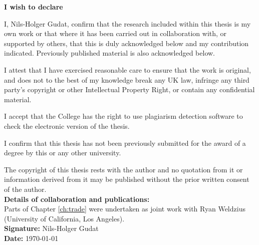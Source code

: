 \begin{onehalfspacing}

\begin{declaration}      %

\thispagestyle{plain}

\textbf{I wish to declare}

I, Nils-Holger Gudat, confirm that the research included within this thesis is my own work or that where it has been carried out in collaboration with, or supported by others, that this is duly acknowledged below and my contribution indicated. Previously published material is also acknowledged below.

I attest that I have exercised reasonable care to ensure that the work is original, and does not to the best of my knowledge break any UK law, infringe any third party's copyright or other Intellectual Property Right, or contain any confidential material.

I accept that the College has the right to use plagiarism detection software to check the electronic version of the thesis.

I confirm that this thesis has not been previously submitted for the award of a degree by this or any other university.

The copyright of this thesis rests with the author and no quotation from it or information derived from it may be published without the prior written consent of the author.\\

\textbf{Details of collaboration and publications:}\\
Parts of Chapter \ref{ch:trade} were undertaken as joint work with Ryan Weldzius (University of California, Los Angeles).\\

\textbf{Signature:} Nils-Holger Gudat \\
\textbf{Date:} \today


\end{declaration}

\end{onehalfspacing}
